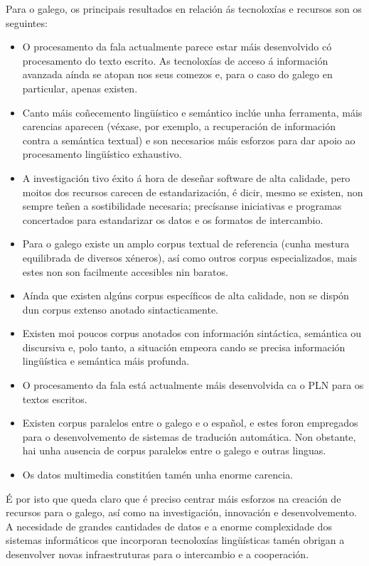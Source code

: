 \begin{multicols}{2}
Para o galego, os principais resultados en relación ás tecnoloxías e recursos son os seguintes:

\begin{itemize}
		\item O procesamento da fala actualmente parece estar máis desenvolvido có procesamento do texto escrito. As tecnoloxías de acceso á información avanzada aínda se atopan nos seus comezos e, para o caso do galego en particular, apenas existen.
		\item Canto máis coñecemento lingüístico e semántico inclúe unha ferramenta, máis carencias aparecen (véxase, por exemplo, a recuperación de información contra a semántica textual) e son necesarios máis esforzos para dar apoio ao procesamento lingüístico exhaustivo. 
		\item A investigación tivo éxito á hora de deseñar software de alta calidade, pero moitos dos recursos carecen de estandarización, é dicir, mesmo se existen, non sempre teñen a sostibilidade necesaria; precísanse iniciativas e programas concertados para estandarizar os datos e os formatos de intercambio.
		\item	Para o galego existe un amplo corpus textual de referencia (cunha mestura equilibrada de diversos xéneros), así como outros corpus especializados, mais estes non son facilmente accesibles nin baratos.
		\item Aínda que existen algúns corpus específicos de alta calidade, non se dispón dun corpus extenso anotado sintacticamente.
		\item Existen moi poucos corpus anotados con información sintáctica, semántica ou discursiva e, polo tanto, a situación empeora cando se precisa información lingüística e semántica máis profunda.
		\item O procesamento da fala está actualmente máis desenvolvida ca o PLN para os textos escritos.
		\item Existen corpus paralelos entre o galego e o español, e estes foron empregados para o desenvolvemento de sistemas de tradución automática. Non obstante, hai unha ausencia de corpus paralelos entre o galego e outras linguas.
		\item Os datos multimedia constitúen tamén unha enorme carencia.
\end{itemize}


É por isto que queda claro que é preciso centrar máis esforzos na creación de recursos para o galego, así como na investigación, innovación e desenvolvemento. A necesidade de grandes cantidades de datos e a enorme complexidade dos sistemas informáticos que incorporan tecnoloxías lingüísticas tamén obrigan a desenvolver novas infraestruturas para o intercambio e a cooperación.


\end{multicols}
